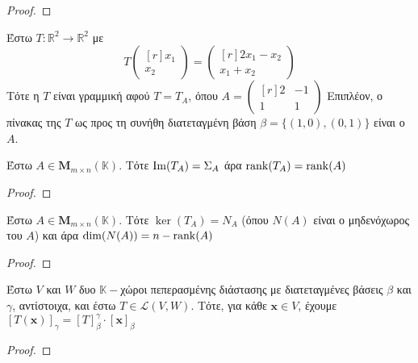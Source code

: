 \begin{proof}
\end{proof}

\begin{example}
  Έστω $ T \colon \mathbb{R}^{2} \to \mathbb{R}^{2} $ με 
  \[
    T \begin{pmatrix*}[r] x_{1} \\ x_{2} \end{pmatrix*} = 
    \begin{pmatrix*}[r] 2 x_{1}- x_{2} \\ x_{1}+ x_{2} \end{pmatrix*}
  \]  
  Τότε η $T$ είναι γραμμική αφού $ T = T_{A} $, όπου $ A = 
  \begin{pmatrix*}[r]
    2 & -1 \\
    1 & 1
  \end{pmatrix*} $
  Επιπλέον, ο πίνακας της $T$ ως προς τη συνήθη διατεταγμένη βάση $ \beta = \{ (1,0),
  (0,1) \} $ είναι ο $A$.
\end{example}

\begin{prop}
  Έστω $ A \in \textbf{M}_{m \times n}(\mathbb{K}) $. Τότε $ \operatorname{Im}(T_{A}) = \Sigma _{A} $ 
  άρα $ \rank(T_{A}) = \rank(A) $
\end{prop}

\begin{proof}

\end{proof}

\begin{prop}
  Έστω $ A \in \textbf{M}_{m \times n}(\mathbb{K}) $. Τότε $ \ker(T_{A}) = N_{A} $ 
  (όπου $ N(A) $ είναι ο μηδενόχωρος του $A$) και άρα $ \dim(N(A)) = n - \rank(A) $
\end{prop}

\begin{proof}

\end{proof}

\begin{thm}
  Έστω $V$ και $W$ δυο $ \mathbb{K}- $χώροι πεπερασμένης διάστασης με διατεταγμένες 
  βάσεις $\beta$ και $\gamma$, αντίστοιχα, και έστω $ T \in \mathcal{L}(V,W) $. 
  Τότε, για κάθε $ \mathbf{x} \in V $, έχουμε 
  $ [T(\mathbf{x})]_{\gamma} = [T]_{\beta}^{\gamma} \cdot [\mathbf{x}]_{\beta} $
\end{thm}

\begin{proof}

\end{proof}

